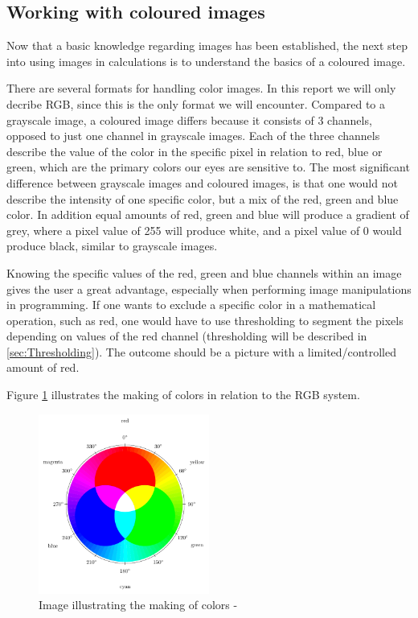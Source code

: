 \subsection{Working with coloured images}
Now that a basic knowledge regarding images has been established, the next step into using images in calculations is to understand the basics of a coloured image.

There are several formats for handling color images. In this report we will only decribe RGB, since this is the only format we will encounter. Compared to a grayscale image, a coloured image differs because it consists of 3 channels, opposed to just one channel in grayscale images. Each of the three channels describe the value of the color in the specific pixel in relation to red, blue or green, which are the primary colors our eyes are sensitive to. The most significant difference between grayscale images and coloured images, is that one would not describe the intensity of one specific color, but a mix of the red, green and blue color. In addition equal amounts of red, green and blue  will produce a gradient of grey, where a pixel value of 255 will produce white, and a pixel value of 0 would produce black, similar to grayscale images.

Knowing the specific values of the red, green and blue channels within an image gives the user a great advantage, especially when performing image manipulations in programming. If one wants to exclude a specific color in a mathematical operation, such as red, one would have to use thresholding to segment the pixels depending on values of the red channel (thresholding will be described in \ref{sec:Thresholding}). The outcome should be a picture with a limited/controlled amount of red. 

Figure \ref{fig:ip_ColorWheel} illustrates the making of colors in relation to the RGB system.

\begin{figure}[htbp]
\centering
\includegraphics[width=0.50\textwidth]{Pictures/Theory/RGBColor.pdf}
\caption{Image illustrating the making of colors - \citep{colorMixing}}
\label{fig:ip_ColorWheel}
\end{figure} 

